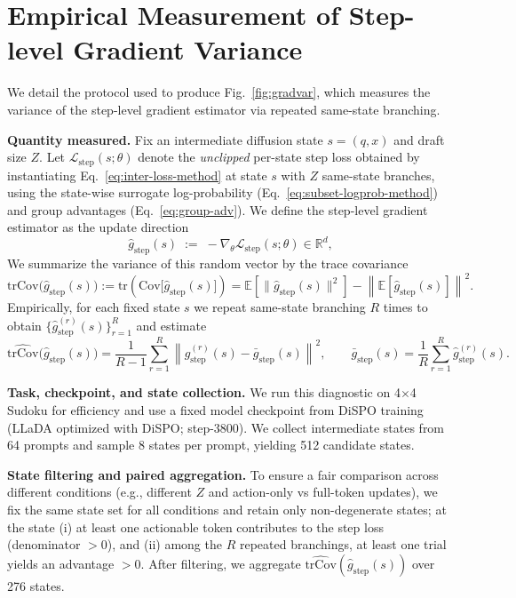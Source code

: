 \documentclass{article}
\theoremstyle{plain}
\theoremstyle{definition}
\theoremstyle{remark}
\begin{document}
\section{Empirical Measurement of Step-level Gradient Variance}
\label{app:gradvar}

We detail the protocol used to produce Fig.~\ref{fig:gradvar}, which measures the variance of the step-level gradient estimator via repeated same-state branching.

\textbf{Quantity measured.}
Fix an intermediate diffusion state $s=(q,x)$ and draft size $Z$.
Let $\mathcal{L}_{\text{step}}(s;\theta)$ denote the \emph{unclipped} per-state step loss obtained by instantiating Eq.~\ref{eq:inter-loss-method} at state $s$ with $Z$ same-state branches, using the state-wise surrogate log-probability (Eq.~\ref{eq:subset-logprob-method}) and group advantages (Eq.~\ref{eq:group-adv}).
We define the step-level gradient estimator as the update direction
\[
\hat g_{\text{step}}(s)\;:=\;-\nabla_\theta \mathcal{L}_{\text{step}}(s;\theta)\in\mathbb{R}^d,
\]
We summarize the variance of this random vector by the trace covariance
\[
\mathrm{trCov}\bigl(\hat g_{\text{step}}(s)\bigr)
:=\mathrm{tr}\!\left(\mathrm{Cov}\bigl[\hat g_{\text{step}}(s)\bigr]\right)
=\mathbb{E}\!\left[\|\hat g_{\text{step}}(s)\|^2\right]-\left\|\mathbb{E}\!\left[\hat g_{\text{step}}(s)\right]\right\|^2.
\]
Empirically, for each fixed state $s$ we repeat same-state branching $R$ times to obtain $\{\hat g^{(r)}_{\text{step}}(s)\}_{r=1}^R$ and estimate
\[
\widehat{\mathrm{trCov}}\bigl(\hat g_{\text{step}}(s)\bigr)
=
\frac{1}{R-1}\sum_{r=1}^R \left\|\hat g^{(r)}_{\text{step}}(s)-\bar g_{\text{step}}(s)\right\|^2,
\qquad
\bar g_{\text{step}}(s)=\frac{1}{R}\sum_{r=1}^R \hat g^{(r)}_{\text{step}}(s).
\]



\textbf{Task, checkpoint, and state collection.}
We run this diagnostic on 4$\times$4 Sudoku for efficiency and use a fixed model checkpoint from DiSPO training (LLaDA optimized with DiSPO; step-3800).
We collect intermediate states from 64 prompts and sample 8 states per prompt, yielding 512 candidate states.

\textbf{State filtering and paired aggregation.}
To ensure a fair comparison across different conditions (e.g., different $Z$ and action-only vs full-token updates), we fix the same state set for all conditions and retain only non-degenerate states;
at the state (i) at least one actionable token contributes to the step loss (denominator $>0$), and
(ii) among the $R$ repeated branchings, at least one trial yields an advantage $>0$.
After filtering, we aggregate $\widehat{\mathrm{trCov}}(\hat g_{\text{step}}(s))$ over 276 states.
\end{document}
